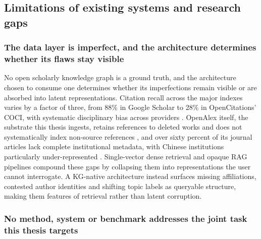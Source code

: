 \subsection{Limitations of existing systems and research gaps}
\label{sec:lr-limitations}

\subsubsection{The data layer is imperfect, and the architecture determines whether its flaws stay visible}

No open scholarly knowledge graph is a ground truth, and the architecture
chosen to consume one determines whether its imperfections remain visible
or are absorbed into latent representations.  Citation recall across the
major indexes varies by a factor of three, from 88\% in Google Scholar to
28\% in OpenCitations' COCI, with systematic disciplinary bias across
providers \cite{martinmartin2021coverage}.  OpenAlex itself, the substrate
this thesis ingests, retains references to deleted works and does not
systematically index non-source references \cite{culbert2025reference},
and over sixty percent of its journal articles lack complete institutional
metadata, with Chinese institutions particularly under-represented
\cite{zhang2024missing}.  Single-vector dense retrieval and opaque RAG
pipelines compound these gaps by collapsing them into representations the
user cannot interrogate.  A KG-native architecture instead surfaces
missing affiliations, contested author identities and shifting topic
labels as queryable structure, making them features of retrieval rather
than latent corruption. \\

\subsubsection{No method, system or benchmark addresses the joint task this thesis targets}
\label{sec:lr-gap}

